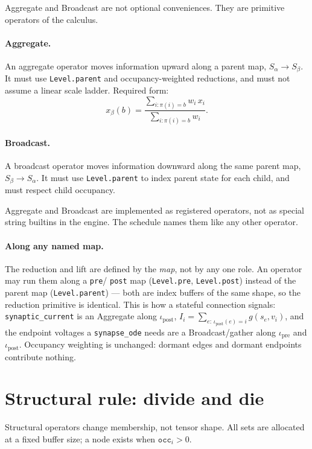 \documentclass[11pt]{article}
\newcommand{\code}[1]{\texttt{#1}}
\begin{document}
Aggregate and Broadcast are not optional conveniences. They are primitive operators
of the calculus.

\paragraph{Aggregate.}
An aggregate operator moves information upward along a parent map, $S_\alpha \to
S_\beta$. It must use \code{Level.parent} and occupancy-weighted reductions, and
must not assume a linear scale ladder. Required form:
\[
x_\beta(b) = \frac{\sum_{i:\pi(i)=b} w_i\, x_i}{\sum_{i:\pi(i)=b} w_i}.
\]

\paragraph{Broadcast.}
A broadcast operator moves information downward along the same parent map, $S_\beta
\to S_\alpha$. It must use \code{Level.parent} to index parent state for each child,
and must respect child occupancy.

Aggregate and Broadcast are implemented as registered operators, not as special
string builtins in the engine. The schedule names them like any other operator.

\paragraph{Along any named map.} The reduction and lift are defined by the
\emph{map}, not by any one role. An operator may run them along a \code{pre}/%
\code{post} map (\code{Level.pre}, \code{Level.post}) instead of the parent map
(\code{Level.parent}) --- both are index buffers of the same shape,
so the reduction primitive is identical. This is how a stateful connection signals:
\code{synaptic\_current} is an Aggregate along $\iota_{\mathrm{post}}$,
$I_i = \sum_{e:\,\iota_{\mathrm{post}}(e)=i} g(s_e,v_i)$, and the endpoint voltages a
\code{synapse\_ode} needs are a Broadcast/gather along $\iota_{\mathrm{pre}}$ and
$\iota_{\mathrm{post}}$. Occupancy weighting is unchanged: dormant edges and dormant
endpoints contribute nothing.

\section{Structural rule: divide and die}

Structural operators change membership, not tensor shape. All sets are allocated at
a fixed buffer size; a node exists when $\texttt{occ}_i > 0$.
\end{document}
